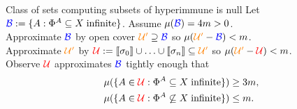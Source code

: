 \begin{frame}{Class of sets computing subsets of hyperimmune is null}
  Let $\textcolor{blue}{\mathcal{B}} :=\{A: \Phi^A \subseteq X\;
  \text{infinite}\}$. Assume $\mu(\textcolor{blue}{\mathcal{B}})=4m>0$.\\
  Approximate $\textcolor{blue}{\mathcal{B}}$ by open cover
  $\textcolor{orange}{\mathcal{U}'} \supseteq\textcolor{blue}{\mathcal{B}}$
  so $\mu(\textcolor{orange}{\mathcal{U}'}
  -\textcolor{blue}{\mathcal{B}})<m$.\\
  Approximate $\textcolor{orange}{\mathcal{U}'}$ by
  $\textcolor{red}{\mathcal{U}} :=\llbracket\sigma_0\rrbracket \cup
  \ldots\cup\llbracket\sigma_n\rrbracket
  \subseteq\textcolor{orange}{\mathcal{U}'}$ so
  $\mu(\textcolor{orange}{\mathcal{U}'} -\textcolor{red}{\mathcal{U}})
  <m$.\\

  Observe $\textcolor{red}{\mathcal{U}}$ approximates
  $\textcolor{blue}{\mathcal{B}}$
  tightly enough that
  \begin{align*}
    \mu(\{A\in\textcolor{red}{\mathcal{U}}: \Phi^A \subseteq X\;
    \text{infinite}\}) &\geq 3m,\\
    \mu(\{A\in\textcolor{red}{\mathcal{U}}: \Phi^A \not\subseteq X\;
    \text{infinite}\}) &\leq m.
  \end{align*}

  \begin{center}
  \end{center}
\end{frame}

